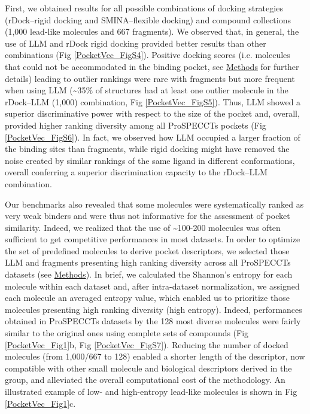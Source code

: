 First, we obtained results for all possible combinations of docking strategies (rDock--rigid docking and SMINA--flexible docking) and compound collections (1,000 lead-like molecules and 667 fragments). We observed that, in general, the use of LLM and rDock rigid docking provided better results than other combinations (Fig \ref{PocketVec_FigS4}). Positive docking scores (i.e. molecules that could not be accommodated in the binding pocket, see \hyperref[PocketVec_Methods]{Methods} for further details) leading to outlier rankings were rare with fragments but more frequent when using LLM (\textasciitilde35\% of structures had at least one outlier molecule in the rDock--LLM (1,000) combination, Fig \ref{PocketVec_FigS5}). Thus, LLM showed a superior discriminative power with respect to the size of the pocket and, overall, provided higher ranking diversity among all ProSPECCTs pockets (Fig \ref{PocketVec_FigS6}). In fact, we observed how LLM occupied a larger fraction of the binding sites than fragments, while rigid docking might have removed the noise created by similar rankings of the same ligand in different conformations, overall conferring a superior discrimination capacity to the rDock--LLM combination.

Our benchmarks also revealed that some molecules were systematically ranked as very weak binders and were thus not informative for the assessment of pocket similarity. Indeed, we realized that the use of \textasciitilde100-200 molecules was often sufficient to get competitive performances in most datasets. In order to optimize the set of predefined molecules to derive pocket descriptors, we selected those LLM and fragments presenting high ranking diversity across all ProSPECCTs datasets (see \hyperref[PocketVec_Methods]{Methods}). In brief, we calculated the Shannon’s entropy for each molecule within each dataset and, after intra-dataset normalization, we assigned each molecule an averaged entropy value, which enabled us to prioritize those molecules presenting high ranking diversity (high entropy). Indeed, performances obtained in ProSPECCTs datasets by the 128 most diverse molecules were fairly similar to the original ones using complete sets of compounds (Fig \ref{PocketVec_Fig1}b, Fig \ref{PocketVec_FigS7}). Reducing the number of docked molecules (from 1,000/667 to 128) enabled a shorter length of the descriptor, now compatible with other small molecule and biological descriptors derived in the group\cite{fernandez-torras_integrating_2022, duran-frigola_extending_2020, bertoni_bioactivity_2021}, and alleviated the overall computational cost of the methodology. An illustrated example of low- and high-entropy lead-like molecules is shown in Fig \ref{PocketVec_Fig1}c.

